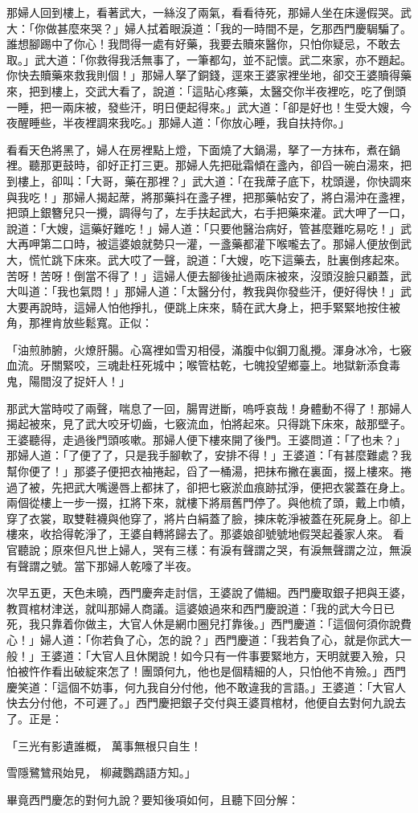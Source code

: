 \begin{showcontents}{}
那婦人回到樓上，看著武大，一絲沒了兩氣，看看待死，那婦人坐在床邊假哭。武大：「你做甚麼來哭？」婦人拭着眼淚道：「我的一時間不是，乞那西門慶駶騙了。誰想腳踢中了你心！我問得一處有好藥，我要去贖來醫你，只怕你疑忌，不敢去取。」武大道：「你救得我活無事了，一筆都勾，並不記懷。武二來家，亦不題起。你快去贖藥來救我則個！」那婦人拏了銅錢，逕來王婆家裡坐地，卻交王婆贖得藥來，把到樓上，交武大看了，說道：「這貼心疼藥，太醫交你半夜裡吃，吃了倒頭一睡，把一兩床被，發些汗，明日便起得來。」武大道：「卻是好也！生受大嫂，今夜醒睡些，半夜裡調來我吃。」那婦人道：「你放心睡，我自扶持你。」

看看天色將黑了，婦人在房裡點上燈，下面燒了大鍋湯，拏了一方抹布，煮在鍋裡。聽那更鼓時，卻好正打三更。那婦人先把砒霜傾在盞內，卻舀一碗白湯來，把到樓上，卻叫：「大哥，藥在那裡？」武大道：「在我蓆子底下，枕頭邊，你快調來與我吃！」那婦人揭起蓆，將那藥抖在盞子裡，把那藥帖安了，將白湯沖在盞裡，把頭上銀簪兒只一攪，調得勻了，左手扶起武大，右手把藥來灌。武大呷了一口，說道：「大嫂，這藥好難吃！」婦人道：「只要他醫治病好，管甚麼難吃易吃！」武大再呷第二口時，被這婆娘就勢只一灌，一盞藥都灌下喉嚨去了。那婦人便放倒武大，慌忙跳下床來。武大哎了一聲，說道：「大嫂，吃下這藥去，肚裏倒疼起來。苦呀！苦呀！倒當不得了！」這婦人便去腳後扯過兩床被來，沒頭沒臉只顧蓋，武大叫道：「我也氣悶！」那婦人道：「太醫分付，教我與你發些汗，便好得快！」武大要再說時，這婦人怕他掙扎，便跳上床來，騎在武大身上，把手緊緊地按住被角，那裡肯放些鬆寬。正似：

「油煎肺腑，火燎肝腸。心窩裡如雪刃相侵，滿腹中似鋼刀亂攪。渾身冰冷，七竅血流。牙關緊咬，三魂赴枉死城中；喉管枯乾，七魄投望鄉臺上。地獄新添食毒鬼，陽間沒了捉奸人！」

那武大當時哎了兩聲，喘息了一回，腸胃迸斷，嗚呼哀哉！身體動不得了！那婦人揭起被來，見了武大咬牙切齒，七竅流血，怕將起來。只得跳下床來，敲那壁子。王婆聽得，走過後門頭咳嗽。那婦人便下樓來開了後門。王婆問道：「了也未？」那婦人道：「了便了了，只是我手腳軟了，安排不得！」王婆道：「有甚麼難處？我幫你便了！」那婆子便把衣袖捲起，舀了一桶湯，把抹布撇在裏面，掇上樓來。捲過了被，先把武大嘴邊唇上都抹了，卻把七竅淤血痕跡拭淨，便把衣裳蓋在身上。兩個從樓上一步一掇，扛將下來，就樓下將扇舊門停了。與他梳了頭，戴上巾幘，穿了衣裳，取雙鞋襪與他穿了，將片白絹蓋了臉，揀床乾淨被蓋在死屍身上。卻上樓來，收拾得乾淨了，王婆自轉將歸去了。那婆娘卻號號地假哭起養家人來。
看官聽說；原來但凡世上婦人，哭有三樣：有淚有聲謂之哭，有淚無聲謂之泣，無淚有聲謂之號。當下那婦人乾嚎了半夜。

次早五更，天色未曉，西門慶奔走討信，王婆說了備細。西門慶取銀子把與王婆，教買棺材津送，就叫那婦人商議。這婆娘過來和西門慶說道：「我的武大今日已死，我只靠着你做主，大官人休是網巾圈兒打靠後。」西門慶道：「這個何須你說費心！」婦人道：「你若負了心，怎的說？」西門慶道：「我若負了心，就是你武大一般！」王婆道：「大官人且休閑說！如今只有一件事要緊地方，天明就要入殮，只怕被忤作看出破綻來怎了！團頭何九，他也是個精細的人，只怕他不肯殮。」西門慶笑道：「這個不妨事，何九我自分付他，他不敢違我的言語。」王婆道：「大官人快去分付他，不可遲了。」西門慶把銀子交付與王婆買棺材，他便自去對何九說去了。正是：

「三光有影遺誰概，  萬事無根只自生！

雪隱鷺鷥飛始見，  柳藏鸚鵡語方知。」

畢竟西門慶怎的對何九說？要知後項如何，且聽下回分解：





\end{showcontents}
